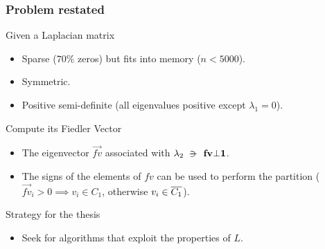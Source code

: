 \begin{frame}
  \frametitle{Problem restated}
  \begin{block}{Given a Laplacian matrix}
    \begin{itemize}
    \item Sparse ($70\%$ zeros) but fits into memory ($n < 5000$).
    \item Symmetric.
    \item Positive semi-definite (all eigenvalues positive except $\lambda_1=0$).
    \end{itemize}
  \end{block}
  \begin{block}{Compute its Fiedler Vector}
    \begin{itemize}
    \item The eigenvector $\vec{fv}$ associated with $\lambda_2 \suchthat \vec{fv} \bot \vec{1}$. 
    \item The signs of the elements of $fv$ can be used to perform the partition ($\vec{fv}_i > 0 \implies v_i \in C_1$, otherwise $v_i \in \overline{C_1}$).
    \end{itemize}
  \end{block}
  \begin{block}{Strategy for the thesis}
    \begin{itemize}
    \item Seek for algorithms that exploit the properties of $L$.
    \end{itemize}
  \end{block}    
\end{frame}
